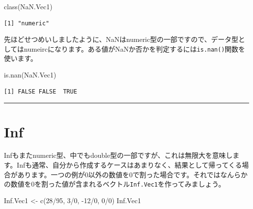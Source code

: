 \documentclass[
  a4paper,
  pandoc,
  ja=standard,
  jafont=haranoaji]{bxjsbook}
\newenvironment{Shaded}{\begin{snugshade}}{\end{snugshade}}
\newcommand{\DecValTok}[1]{\textcolor[rgb]{0.68,0.00,0.00}{#1}}
\newcommand{\FunctionTok}[1]{\textcolor[rgb]{0.28,0.35,0.67}{#1}}
\newcommand{\NormalTok}[1]{\textcolor[rgb]{0.00,0.48,0.65}{#1}}
\newcommand{\OtherTok}[1]{\textcolor[rgb]{0.00,0.48,0.65}{#1}}
\newcommand{\SpecialCharTok}[1]{\textcolor[rgb]{0.37,0.37,0.37}{#1}}
\begin{document}
\begin{Shaded}
\begin{Highlighting}[numbers=left,,]
\FunctionTok{class}\NormalTok{(NaN.Vec1)}
\end{Highlighting}
\end{Shaded}

\begin{verbatim}
[1] "numeric"
\end{verbatim}

先ほどせつめいしましたように、NaNはnumeric型の一部ですので、データ型としてはnumeircになります。ある値がNaNか否かを判定するには\texttt{is.nan()}関数を使います。

\begin{Shaded}
\begin{Highlighting}[numbers=left,,]
\FunctionTok{is.nan}\NormalTok{(NaN.Vec1)}
\end{Highlighting}
\end{Shaded}

\begin{verbatim}
[1] FALSE FALSE  TRUE
\end{verbatim}

\begin{center}\rule{0.5\linewidth}{0.5pt}\end{center}

\hypertarget{sec-type_inf}{%
\section{Inf}\label{sec-type_inf}}

Infもまたnumeric型、中でもdouble型の一部ですが、これは無限大を意味します。Infも通常、自分から作成するケースはあまりなく、結果として帰ってくる場合があります。一つの例が0以外の数値を0で割った場合です。それではなんらかの数値を0を割った値が含まれるベクトル\texttt{Inf.Vec1}を作ってみましょう。

\begin{Shaded}
\begin{Highlighting}[numbers=left,,]
\NormalTok{Inf.Vec1 }\OtherTok{\textless{}{-}} \FunctionTok{c}\NormalTok{(}\DecValTok{28}\SpecialCharTok{/}\DecValTok{95}\NormalTok{, }\DecValTok{3}\SpecialCharTok{/}\DecValTok{0}\NormalTok{, }\SpecialCharTok{{-}}\DecValTok{12}\SpecialCharTok{/}\DecValTok{0}\NormalTok{, }\DecValTok{0}\SpecialCharTok{/}\DecValTok{0}\NormalTok{)}
\NormalTok{Inf.Vec1}
\end{Highlighting}
\end{Shaded}
\end{document}
